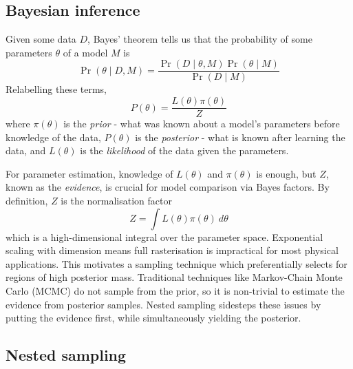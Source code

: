 \documentclass[usenatbib]{mnras} %
\begin{document}
\subsection{Bayesian inference}%
\label{sub:Bayesian inference}

Given some data $D$, Bayes' theorem tells us that the probability of some parameters $\theta$ of a model $M$ is 
\begin{equation}
	\Pr(\theta\mid D, M) = \frac{\Pr(D \mid \theta, M) \Pr(\theta \mid M)}{\Pr(D  \mid  M)}
\end{equation}
Relabelling these terms,
\begin{equation}
    P(\theta) = \frac{L(\theta) \pi(\theta)}{Z}
\end{equation}
where $\pi(\theta)$ is the \textit{prior} - what was known about a model's parameters before knowledge of the data, $P(\theta)$ is the \textit{posterior} - what is known after learning the data, and $L(\theta)$ is the \textit{likelihood} of the data given the parameters.
\par
For parameter estimation, knowledge of $L(\theta)$ and $\pi(\theta)$ is enough, but $Z$, known as the \textit{evidence}, is crucial for model comparison via Bayes factors. By definition, $Z$ is the normalisation factor 
\begin{equation}
    Z = \int L(\theta)\pi(\theta) \ d\theta
\end{equation}
which is a high-dimensional integral over the parameter space. Exponential scaling with dimension means full rasterisation is impractical for most physical applications. This motivates a sampling technique which preferentially selects for regions of high posterior mass. Traditional techniques like Markov-Chain Monte Carlo (MCMC) do not sample from the prior, so it is non-trivial to estimate the evidence from posterior samples. Nested sampling sidesteps these issues by putting the evidence first, while simultaneously yielding the posterior.



\subsection{Nested sampling}
\label{sub:Nested sampling}
\end{document}
